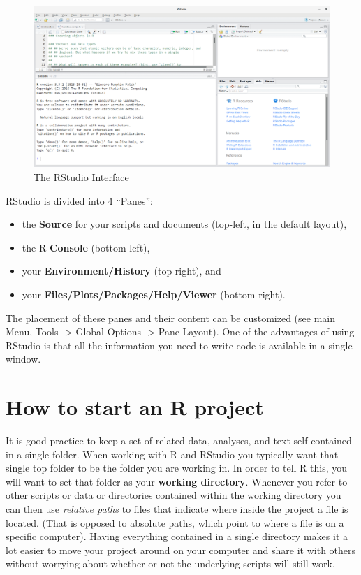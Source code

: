 \documentclass[
]{book}
\providecommand{\tightlist}{%
  \setlength{\itemsep}{0pt}\setlength{\parskip}{0pt}}
\begin{document}
\begin{figure}
\includegraphics[width=1\linewidth]{img/rstudio-screenshot} \caption{The RStudio Interface}\label{fig:RStudio-GUI}
\end{figure}

RStudio is divided into 4 ``Panes'':

\begin{itemize}
\tightlist
\item
  the \textbf{Source} for your scripts and documents
  (top-left, in the default layout),
\item
  the R \textbf{Console} (bottom-left),
\item
  your \textbf{Environment/History} (top-right), and
\item
  your \textbf{Files/Plots/Packages/Help/Viewer} (bottom-right).
\end{itemize}

The placement of these
panes and their content can be customized (see main Menu, Tools -\textgreater{} Global Options -\textgreater{}
Pane Layout). One of the advantages of using RStudio is that all the information
you need to write code is available in a single window.

\hypertarget{how-to-start-an-r-project}{%
\section{How to start an R project}\label{how-to-start-an-r-project}}

It is good practice to keep a set of related data, analyses, and text
self-contained in a single folder. When working with R and RStudio you typically want that single top folder to be the folder you are working in. In order to tell R this, you will want to set that folder as your \textbf{working directory}. Whenever you refer to other scripts or data or directories contained within the working directory you can then use \emph{relative paths} to files that indicate
where inside the project a file is located. (That is opposed to absolute paths, which
point to where a file is on a specific computer). Having everything contained in a single directory makes it
a lot easier to move your project around on your computer and share it with
others without worrying about whether or not the underlying scripts will still
work.
\end{document}
